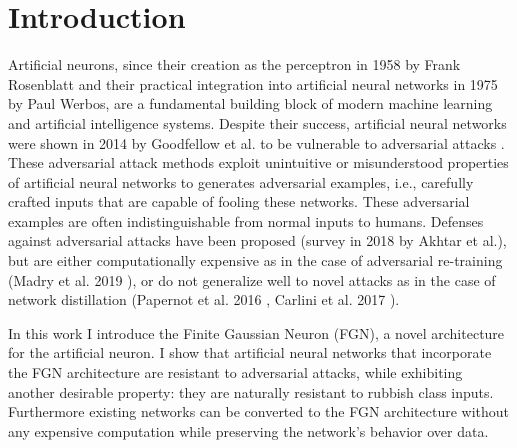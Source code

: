 \documentclass[12pt,oneside]{CUNY_PhD}
\begin{document}

\tableofcontents

\mainmatter

\chapter{Introduction}
Artificial neurons, since their creation as the perceptron in 1958 by Frank Rosenblatt\cite{rosenblatt1958perceptron} and their practical integration into artificial neural  networks in 1975 by Paul Werbos\cite{werbos1975beyond}, are a fundamental building block of modern machine learning and artificial intelligence systems. Despite their success, artificial neural networks were shown in 2014 by Goodfellow et al.\cite{goodfellow2015explaining} to be vulnerable to adversarial attacks . These adversarial attack methods exploit unintuitive or misunderstood properties of artificial neural networks to generates adversarial examples, i.e., carefully crafted inputs that are capable of fooling these networks. These adversarial examples are often indistinguishable from normal inputs to humans. 
Defenses against adversarial attacks have been proposed (survey in 2018 by Akhtar et al.\cite{akhtar2018threat}), but are either computationally expensive as in the case of adversarial re-training (Madry et al. 2019 \cite{madry2019deep}), or do not generalize well to novel attacks as in the case of network distillation (Papernot et al. 2016 \cite{Papernot2016DistillationAA}, Carlini et al. 2017  \cite{carlini2017evaluating}).

In this work I introduce the Finite Gaussian Neuron (FGN), a novel architecture for the artificial neuron. I show that artificial neural networks that incorporate the FGN architecture are resistant to adversarial attacks, while exhibiting another desirable property: they are naturally resistant to rubbish class inputs. Furthermore existing networks can be converted to the FGN architecture without any expensive computation while preserving the network's behavior over data.
\end{document}
